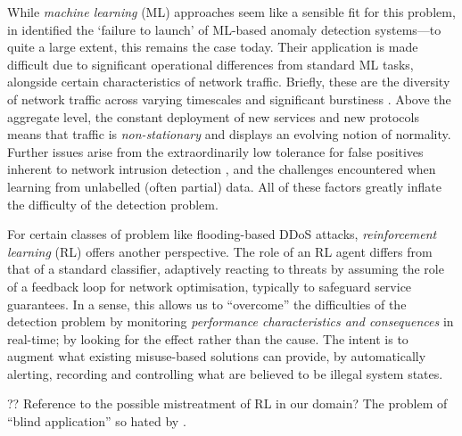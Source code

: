 \documentclass[conference, letterpaper, 10pt, times]{IEEEtran}
\begin{document}
While \emph{machine learning} (ML) approaches seem like a sensible fit for this problem, in \citeyear{DBLP:conf/sp/SommerP10} \textcite{DBLP:conf/sp/SommerP10} identified the `failure to launch' of ML-based anomaly detection systems---to quite a large extent, this remains the case today.
Their application is made difficult due to significant operational differences from standard ML tasks, alongside certain characteristics of network traffic.
Briefly, these are the diversity of network traffic across varying timescales \cite{DBLP:conf/sp/SommerP10} and significant burstiness \cite{DBLP:journals/ccr/LelandWTW95}.
Above the aggregate level, the constant deployment of new services and new protocols means that traffic is \emph{non-stationary} and displays an evolving notion of normality.
Further issues arise from the extraordinarily low tolerance for false positives inherent to network intrusion detection \cite{DBLP:conf/ccs/Axelsson99}, and the challenges encountered when learning from unlabelled (often partial) data.
All of these factors greatly inflate the difficulty of the detection problem.

For certain classes of problem like flooding-based DDoS attacks, \emph{reinforcement learning} (RL) offers another perspective.
The role of an RL agent differs from that of a standard classifier, adaptively reacting to threats by assuming the role of a feedback loop for network optimisation, typically to safeguard service guarantees.
In a sense, this allows us to ``overcome'' the difficulties of the detection problem by monitoring \emph{performance characteristics and consequences} in real-time; by looking for the effect rather than the cause.
The intent is to augment what existing misuse-based solutions can provide, by automatically alerting, recording and controlling what are believed to be illegal system states.

?? Reference to the possible mistreatment of RL in our domain? The problem of ``blind application'' so hated by \textcite{DBLP:conf/sp/SommerP10}.
\end{document}
